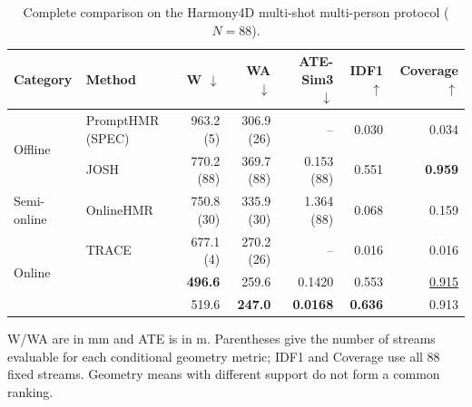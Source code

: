 \begin{table}[t]
  \centering
  \caption{Complete comparison on the Harmony4D multi-shot multi-person
  protocol ($N=88$).}
  \label{tab:supp-harmony4d-complete}
  \supptablesize
  \setlength{\tabcolsep}{5pt}
  \renewcommand{\arraystretch}{0.92}
  \begin{tabular}{llrrrrr}
    \toprule
    Category & Method & W $\downarrow$ & WA $\downarrow$ & ATE-Sim3 $\downarrow$ &
    IDF1 $\uparrow$ & Coverage $\uparrow$ \\
    \midrule
    \multirow{2}{*}{Offline}
      & PromptHMR (SPEC) & 963.2 (5) & 306.9 (26) & -- & 0.030 & 0.034 \\
      & JOSH & 770.2 (88) & 369.7 (88) & 0.153 (88) & 0.551 & \textbf{0.959} \\
    \midrule
    Semi-online
      & OnlineHMR & 750.8 (30) & 335.9 (30) & 1.364 (88) & 0.068 & 0.159 \\
    \midrule
    \multirow{3}{*}{Online}
      & TRACE & 677.1 (4) & 270.2 (26) & -- & 0.016 & 0.016 \\
      & \humanthree{} & \textbf{496.6} & 259.6 & 0.1420 & 0.553 & \underline{0.915} \\
      & \textbf{\method{}} & 519.6 & \textbf{247.0} & \textbf{0.0168} & \textbf{0.636} & 0.913 \\
    \bottomrule
  \end{tabular}
  \vspace{0.5mm}

  \parbox{0.94\textwidth}{\footnotesize
  W/WA are in mm and ATE is in m. Parentheses give the number of streams
  evaluable for each conditional geometry metric; IDF1 and Coverage use all 88
  fixed streams. Geometry means with different support do not form a common
  ranking.}
\end{table}
